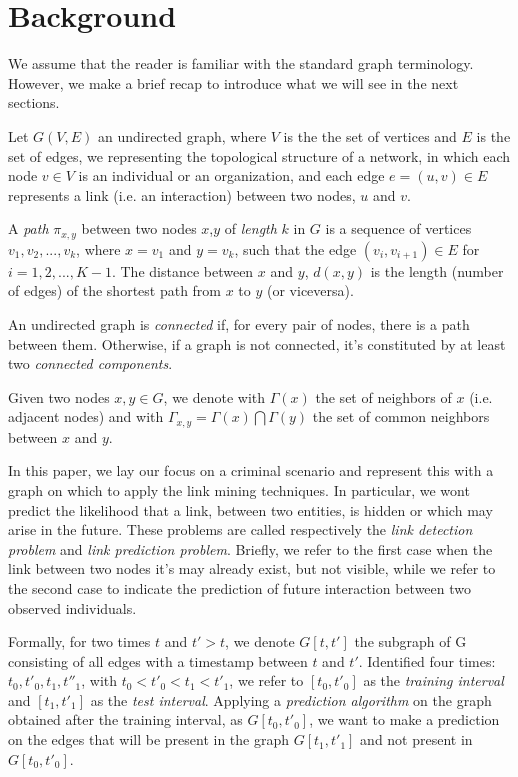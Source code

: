 \section{Background}
\label{sec:background}
We assume that the reader is familiar with the standard graph terminology. However, we make a brief recap to introduce what we will see in the next sections.

Let $G(V,E)$ an undirected graph, where $V$ is the the set of vertices and $E$ is the set of edges, we representing the topological structure of a network, in which each node $v \in V$ is an individual or an organization, and each edge $e=(u,v)\in E$ represents a link (i.e. an interaction) between two nodes, $u$ and $v$. 

A \textit{path} $\pi_{x,y}$ between two nodes $x$,$y$ of \textit{length} $k$ in $G$ is a sequence of vertices $v_{1},v_{2},...,v_{k}$, where $x = v_{1}$ and $y = v_{k}$, such that the edge $(v_{i},v_{i+1}) \in E$ for $i = 1, 2,..., K-1$. The distance between $x$ and $y$, $d(x,y)$ is the length (number of edges) of the shortest path from $x$ to $y$ (or viceversa).

An undirected graph is \textit{connected} if, for every pair of nodes, there is a path between them. Otherwise, if a graph is not connected, it's constituted by at least two \textit{connected components}.

Given two nodes $x,y \in G$, we denote with $\Gamma(x)$ the set of neighbors of $x$ (i.e. adjacent nodes) and with $\Gamma_{x,y} = \Gamma(x) \bigcap \Gamma(y)$ the set of common neighbors between $x$ and $y$.

In this paper, we lay our focus on a criminal scenario and represent this with a graph on which to apply the link mining techniques. In particular, we wont predict the likelihood that a link, between two entities, is hidden or which may arise in the future. These problems are called respectively the \textit{link detection problem} and \textit{link prediction problem}. Briefly, we refer to the first case when the link between two nodes it's may already exist, but not visible, while we refer to the second case to indicate the prediction of future interaction between two observed individuals\cite{Hasan2011}.

Formally, for two times $t$ and $t' > t$, we denote $G[t,t']$ the subgraph of G consisting of all edges with a timestamp between $t$ and $t'$. Identified four times: $t_{0}, t'_{0}, t_{1}, t''_{1}$, with $t_{0}<t'_{0}<t_{1}<t'_{1}$, we refer to $[t_{0},t'_{0}]$ as the \textit{training interval} and $[t_{1},t'_{1}]$ as the \textit{test interval}. Applying a \textit{prediction algorithm} on the graph obtained after the training interval, as $G[t_{0},t'_{0}]$, we want to make a prediction on the edges that will be present in the graph $G[t_{1},t'_{1}]$ and not present in $G[t_{0},t'_{0}]$\cite{Liben-Nowell}.

